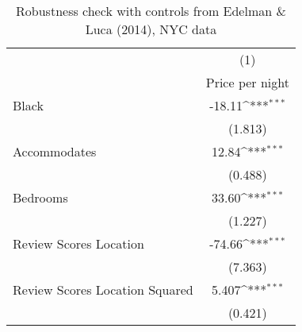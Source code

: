 {
\def\sym#1{\ifmmode^{#1}\else\(^{#1}\)\fi}
\begin{longtable}{l*{1}{c}}
\caption{Robustness check with controls from Edelman \& Luca (2014), NYC data} \label{table:edelman}\\
\hline\hline\endfirsthead\hline\endhead\hline\endfoot\endlastfoot
                    &\multicolumn{1}{c}{(1)}\\
                    &\multicolumn{1}{c}{Price per night}\\
\hline
Black               &      -18.11\sym{***}\\
                    &     (1.813)         \\
Accommodates        &       12.84\sym{***}\\
                    &     (0.488)         \\
Bedrooms            &       33.60\sym{***}\\
                    &     (1.227)         \\
Review Scores Location&      -74.66\sym{***}\\
                    &     (7.363)         \\
Review Scores Location Squared           &       5.407\sym{***}\\
                    &     (0.421)         \\


\end{longtable}}
